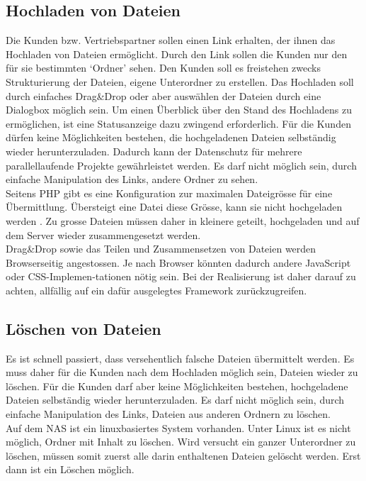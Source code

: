 \subsection{Hochladen von Dateien}
Die Kunden bzw. Vertriebspartner sollen einen Link erhalten, der ihnen das Hochladen von Dateien ermöglicht. Durch den Link sollen die Kunden nur den für sie bestimmten `Ordner' sehen. 
Den Kunden soll es freistehen zwecks Strukturierung der Dateien, eigene Unterordner zu erstellen.
Das Hochladen soll durch einfaches Drag\&Drop oder aber auswählen der Dateien durch eine Dialogbox möglich sein. 
Um einen Überblick über den Stand des Hochladens zu ermöglichen, ist eine Statusanzeige dazu zwingend erforderlich. 
Für die Kunden dürfen keine Möglichkeiten bestehen, die hochgeladenen Dateien selbständig wieder herunterzuladen. 
Dadurch kann der Datenschutz für mehrere parallellaufende Projekte gewährleistet werden.
Es darf nicht möglich sein, durch einfache Manipulation des Links, andere Ordner zu sehen.  
\\
Seitens PHP gibt es eine Konfiguration zur maximalen Dateigrösse für eine Übermittlung. Übersteigt eine Datei diese Grösse, kann sie nicht hochgeladen werden \cite{PHPpitfalls}. 
Zu grosse Dateien müssen daher in kleinere geteilt, hochgeladen und auf dem Server wieder zusammengesetzt werden.
\\ 
Drag\&Drop sowie das Teilen und Zusammensetzen von Dateien werden Browserseitig angestossen. Je nach Browser könnten dadurch andere JavaScript oder CSS-Implemen-tationen nötig sein.
Bei der Realisierung ist daher darauf zu achten, allfällig auf ein dafür ausgelegtes Framework zurückzugreifen. 

\subsection{Löschen von Dateien}
Es ist schnell passiert, dass versehentlich falsche Dateien übermittelt werden. 
Es muss daher für die Kunden nach dem Hochladen möglich sein, Dateien wieder zu löschen. 
Für die Kunden darf aber keine Möglichkeiten bestehen, hochgeladene Dateien selbständig wieder herunterzuladen. 
Es darf nicht möglich sein, durch einfache Manipulation des Links, Dateien aus anderen Ordnern zu löschen.
\\
Auf dem NAS ist ein linuxbasiertes System vorhanden. Unter Linux ist es nicht möglich, Ordner mit Inhalt zu löschen. 
Wird versucht ein ganzer Unterordner zu löschen, müssen somit zuerst alle darin enthaltenen Dateien gelöscht werden. Erst dann ist ein Löschen möglich.

